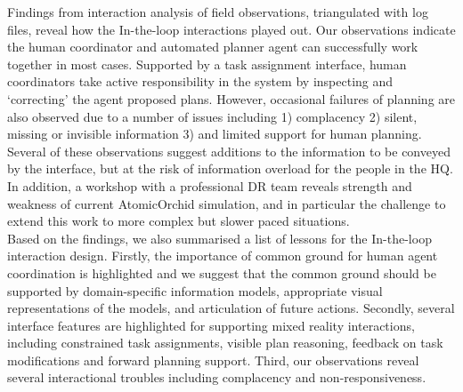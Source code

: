 Findings from interaction analysis of field observations, triangulated with log files, reveal how the In-the-loop interactions played out. Our observations indicate the human coordinator and automated planner agent can successfully work together in most cases. Supported by a task assignment interface, human coordinators take active responsibility in the system by inspecting and `correcting' the agent proposed plans. However, occasional failures of planning are also observed due to a number of issues including 1) complacency 2) silent, missing or invisible information 3) and limited support for human planning. Several of these observations suggest additions to the information to be conveyed by the interface, but at the risk of information overload for the people in the HQ. In addition, a workshop with a professional DR team reveals strength and weakness of current AtomicOrchid simulation, and in particular the challenge to extend this work to more complex but slower paced situations.\\

Based on the findings, we also summarised a list of lessons for the In-the-loop interaction design. Firstly, the importance of common ground for human agent coordination is highlighted and we suggest that the common ground should be supported by domain-specific information models, appropriate visual representations of the models, and articulation of future actions. Secondly, several interface features are highlighted for supporting mixed reality interactions, including 
constrained task assignments, visible plan reasoning, feedback on task modifications and forward planning support. Third, our observations reveal several interactional troubles including complacency and non-responsiveness.\\



